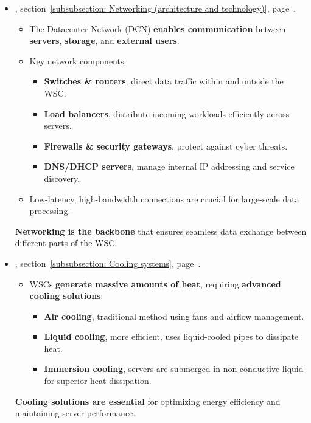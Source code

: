 \begin{itemize}
	\item {}, section~\ref{subsubsection: Networking (architecture and technology)}, page~\pageref{subsubsection: Networking (architecture and technology)}.
    \begin{itemize}
        \item The Datacenter Network (DCN) \textbf{enables communication} between \textbf{servers}, \textbf{storage}, and \textbf{external users}.
        \item Key network components:
        \begin{itemize}
        	\item \textbf{Switches \& routers}, direct data traffic within and outside the WSC.
        	\item \textbf{Load balancers}, distribute incoming workloads efficiently across servers.
        	\item \textbf{Firewalls \& security gateways}, protect against cyber threats.
        	\item \textbf{DNS/DHCP servers}, manage internal IP addressing and service discovery.
        \end{itemize}
        \item Low-latency, high-bandwidth connections are crucial for large-scale data processing.
    \end{itemize}
    \textbf{Networking is the backbone} that ensures seamless data exchange between different parts of the WSC.
	
	\item {}, section~\ref{subsubsection: Cooling systems}, page~\pageref{subsubsection: Cooling systems}.
    \begin{itemize}
        \item WSCs \textbf{generate massive amounts of heat}, requiring \textbf{advanced cooling solutions}:
        \begin{itemize}
        	\item \textbf{Air cooling}, traditional method using fans and airflow management.
        	\item \textbf{Liquid cooling}, more efficient, uses liquid-cooled pipes to dissipate heat.
        	\item \textbf{Immersion cooling}, servers are submerged in non-conductive liquid for superior heat dissipation.
        \end{itemize}
    \end{itemize}
    \textbf{Cooling solutions are essential} for optimizing energy efficiency and maintaining server performance.
	

\end{itemize}
